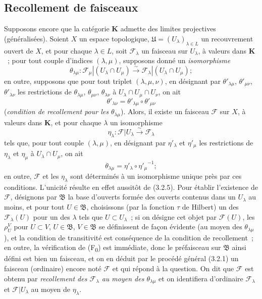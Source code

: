 \subsection{Recollement de faisceaux}
\label{subsection:0.3.3-fr}

\begin{env}[3.3.1]
\label{0.3.3.1-fr}
Supposons encore que la catégorie $\mathbf{K}$ admette des limites projectives
(généralisées). Soient $X$ un espace topologique,
$\mathfrak{U}=(U_\lambda)_{\lambda\in L}$ un recouvrement ouvert de $X$, et
pour chaque $\lambda\in L$, soit $\mathcal{F}_\lambda$ un faisceau sur
$U_\lambda$, à valeurs dans $\mathbf{K}$~; pour tout couple d'indices
$(\lambda,\mu)$, supposons donné un \emph{isomorphisme}
\[
  \theta_{\lambda\mu}:
  \mathcal{F}_\mu|(U_\lambda\cap U_\mu)
  \xrightarrow{\sim}
  \mathcal{F}_\lambda|(U_\lambda\cap U_\mu);
\]
en outre, supposons que pour tout triplet $(\lambda,\mu,\nu)$, en désignant par
$\theta'_{\lambda\mu}$, $\theta'_{\mu\nu}$, $\theta'_{\lambda\nu}$ les
restrictions de $\theta_{\lambda\mu}$, $\theta_{\mu\nu}$,
$\theta_{\lambda\nu}$ à $U_\lambda\cap U_\mu\cap U_\nu$, on ait
\[
  \theta'_{\lambda\nu}
  =\theta'_{\lambda\mu}\circ\theta'_{\mu\nu}
\]
(\emph{condition de recollement pour les $\theta_{\lambda\mu}$}). Alors, il
existe un faisceau $\mathcal{F}$ sur $X$, à valeurs dans $\mathbf{K}$, et pour
chaque $\lambda$ un isomorphisme
\[
  \eta_\lambda:\mathcal{F}|U_\lambda\xrightarrow{\sim}\mathcal{F}_\lambda
\]
tels que, pour tout couple $(\lambda,\mu)$, en désignant par
$\eta'_\lambda$ et $\eta'_\mu$ les restrictions de $\eta_\lambda$ et
$\eta_\mu$ à $U_\lambda\cap U_\mu$, on ait
\[
  \theta_{\lambda\mu}=\eta'_\lambda\circ{\eta'_\mu}^{-1};
\]
en outre, $\mathcal{F}$ et les $\eta_\lambda$ sont déterminés à un
isomorphisme unique près par ces conditions. L'unicité résulte en effet
aussitôt de (3.2.5). Pour établir l'existence de $\mathcal{F}$, désignons par
$\mathfrak{B}$ la base d'ouverts formée des ouverts contenus dans un
$U_\lambda$ au moins, et pour tout $U\in\mathfrak{B}$, choisissons (par la
fonction $\tau$ de Hilbert) un des $\mathcal{F}_\lambda(U)$ pour un des
$\lambda$ tels que $U\subset U_\lambda$~; si on désigne cet objet par
$\mathcal{F}(U)$, les $\rho_U^V$ pour $U\subset V$, $U\in\mathfrak{B}$,
$V\in\mathfrak{B}$ se définissent de façon évidente (au moyen des
$\theta_{\lambda\mu}$), et la condition de transitivité est conséquence de la
condition de recollement~; en outre, la vérification de
(F\textsubscript{0}) est immédiate, donc le préfaisceau sur $\mathfrak{B}$
ainsi défini est bien un faisceau, et on en déduit par le procédé général
(3.2.1) un faisceau (ordinaire) encore noté $\mathcal{F}$ et qui répond à la
question. On dit que $\mathcal{F}$ est obtenu par \emph{recollement des
$\mathcal{F}_\lambda$ au moyen des $\theta_{\lambda\mu}$} et on identifiera
d'ordinaire $\mathcal{F}_\lambda$ et $\mathcal{F}|U_\lambda$ au moyen de
$\eta_\lambda$.


\end{env}
